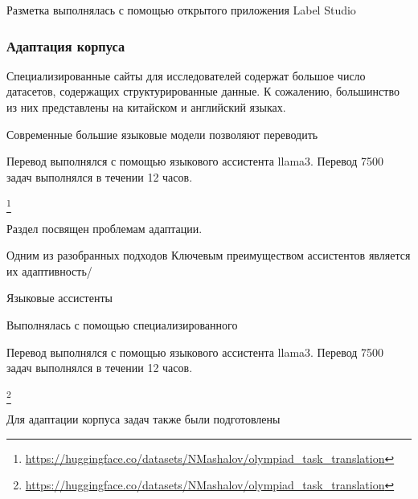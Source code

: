 Разметка выполнялась с помощью открытого приложения Label Studio \cite{LabelStudio}


\subsubsection{Адаптация корпуса}
Специализированные сайты для исследователей содержат
большое число датасетов, содержащих структурированные данные. 
К сожалению, большинство из них представлены на китайском и английский языках. 

Современные большие языковые модели позволяют переводить 



Перевод выполнялся с помощью языкового ассистента llama3. Перевод 7500 задач выполнялся в течении 12 часов.

\footnote{\url{https://huggingface.co/datasets/NMashalov/olympiad_task_translation}}



Раздел посвящен проблемам адаптации.



Одним из разобранных подходов Ключевым преимуществом ассистентов является их адаптивность/

Языковые ассистенты 

Выполнялась с помощью специализированного 

Перевод выполнялся с помощью языкового ассистента llama3. Перевод 7500 задач выполнялся в течении 12 часов.

\footnote{\url{https://huggingface.co/datasets/NMashalov/olympiad_task_translation}}



Для адаптации корпуса задач также были подготовлены



